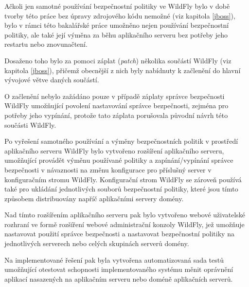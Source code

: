 Ačkoli jen samotné používání bezpečnostní politiky ve WildFly bylo v době tvorby této práce bez úpravy zdrojového kódu nemožné (viz kapitola \ref{jboss}),
bylo v rámci této bakalářské práce umožněno nejen používání bezpečnostní politiky, ale také její výměna za běhu aplikačního serveru bez potřeby
jeho restartu nebo znovunačtení.

Dosaženo toho bylo za pomoci záplat ({\it patch}) několika součástí WildFly (viz kapitola \ref{jboss}), přičemž obecnější z nich byly nabídnuty
k začlenění do hlavní vývojové větve daných součástí. \cite{smPullRequest}\cite{jbossModulesPullRequest}

O začlenění nebylo zažádáno pouze v případě záplaty správce bezpečnosti WildFly umožňující povolení nastavování správce bezpečnosti,
zejména pro potřeby jeho vypínání, protože tato záplata porušovala původní návrh této součásti WildFly.

Po vyřešení samotného používání a výměny bezpečnostních politik v prostředí aplikačního serveru WildFly bylo vytvořeno rozšíření aplikačního serveru,
umožňující provádět výměnu používané politiky a zapínání/vypínání správce bezpečnosti v návaznosti na změnu konfigurace pro příslušný server
v konfiguračním stromu WildFly. Konfigurační strom WildFly se zároveň používá také pro ukládání jednotlivých souborů bezpečnostní politiky,
které jsou tímto způsobem distribuovány napříč aplikačními servery domény.

Nad tímto rozšířením aplikačního serveru pak bylo vytvořeno webové uživatelské rozhraní ve formě rozšíření webové administrační konzoly WildFly,
jež umožňuje nastavovat použití správce bezpečnosti a nastavovat bezpečnostní politiky na jednotlivých serverech nebo celých skupinách serverů
domény.

Na implementované řešení pak byla vytvořena automatizovaná sada testů umožňující otestovat schopnosti implementovaného systému měnit oprávnění
aplikací nasazených na aplikačním serveru nebo doméně aplikačních serverů.


